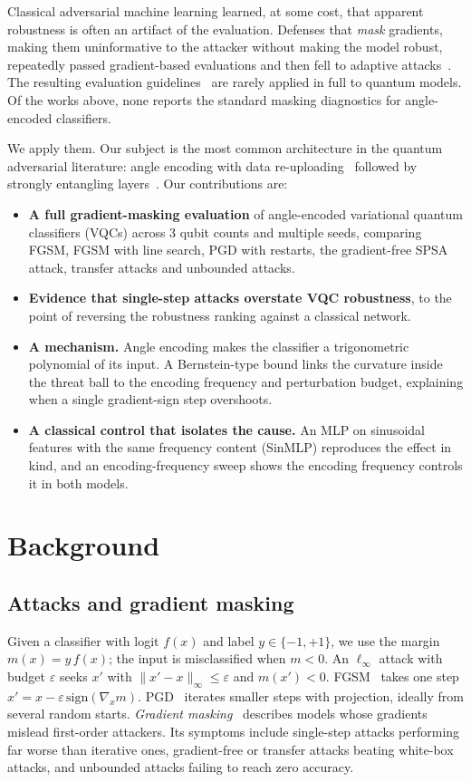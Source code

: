 \documentclass[11pt]{article}
\begin{document}
Classical adversarial machine learning learned, at some cost, that apparent robustness is often an artifact of the evaluation. Defenses that \emph{mask} gradients, making them uninformative to the attacker without making the model robust, repeatedly passed gradient-based evaluations and then fell to adaptive attacks~\cite{athalye2018,uesato2018,tramer2020}. The resulting evaluation guidelines~\cite{carlini2019,croce2020} are rarely applied in full to quantum models. Of the works above, none reports the standard masking diagnostics for angle-encoded classifiers.

We apply them. Our subject is the most common architecture in the quantum adversarial literature: angle encoding with data re-uploading~\cite{perezsalinas2020} followed by strongly entangling layers~\cite{schuld2020}. Our contributions are:

\begin{itemize}
\item \textbf{A full gradient-masking evaluation} of angle-encoded variational quantum classifiers (VQCs) across 3 qubit counts and multiple seeds, comparing FGSM, FGSM with line search, PGD with restarts, the gradient-free SPSA attack, transfer attacks and unbounded attacks.
\item \textbf{Evidence that single-step attacks overstate VQC robustness}, to the point of reversing the robustness ranking against a classical network.
\item \textbf{A mechanism.} Angle encoding makes the classifier a trigonometric polynomial of its input. A Bernstein-type bound links the curvature inside the threat ball to the encoding frequency and perturbation budget, explaining when a single gradient-sign step overshoots.
\item \textbf{A classical control that isolates the cause.} An MLP on sinusoidal features with the same frequency content (SinMLP) reproduces the effect in kind, and an encoding-frequency sweep shows the encoding frequency controls it in both models.
\end{itemize}
\section{Background}\label{sec:bg}
\subsection{Attacks and gradient masking}
Given a classifier with logit $f(x)$ and label $y\in\{-1,+1\}$, we use the margin $m(x)=y\,f(x)$; the input is misclassified when $m<0$. An $\ell_\infty$ attack with budget $\varepsilon$ seeks $x'$ with $\|x'-x\|_\infty\leq\varepsilon$ and $m(x')<0$. FGSM~\cite{goodfellow2015} takes one step $x'=x-\varepsilon\,\mathrm{sign}(\nabla_x m)$. PGD~\cite{madry2018} iterates smaller steps with projection, ideally from several random starts. \emph{Gradient masking}~\cite{athalye2018} describes models whose gradients mislead first-order attackers. Its symptoms include single-step attacks performing far worse than iterative ones, gradient-free or transfer attacks beating white-box attacks, and unbounded attacks failing to reach zero accuracy.
\end{document}

